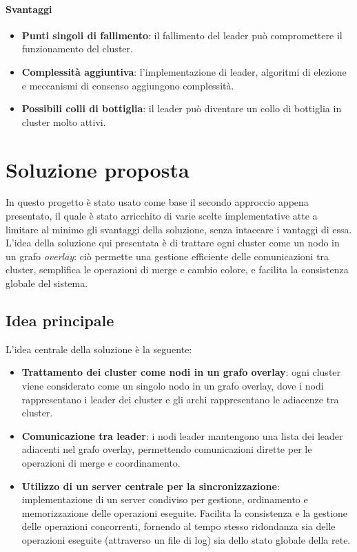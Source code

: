\documentclass[12pt, a4paper]{report}
\begin{document}
\paragraph{Svantaggi}

\begin{itemize}
    \item \textbf{Punti singoli di fallimento}: il fallimento del leader pu\`o compromettere il funzionamento del cluster.
    \item \textbf{Complessit\`a aggiuntiva}: l'implementazione di leader, algoritmi di elezione e meccanismi di consenso aggiungono complessit\`a.
    \item \textbf{Possibili colli di bottiglia}: il leader pu\`o diventare un collo di bottiglia in cluster molto attivi.
\end{itemize}

\section{Soluzione proposta}

In questo progetto \`e stato usato come base il secondo approccio appena presentato, il quale \`e stato arricchito di varie scelte implementative atte a limitare al minimo gli svantaggi della soluzione, senza intaccare i vantaggi di essa. L'idea della soluzione qui presentata \`e di trattare ogni cluster come un nodo in un grafo \emph{overlay}: ci\`o permette una gestione efficiente delle comunicazioni tra cluster, semplifica le operazioni di merge e cambio colore, e facilita la consistenza globale del sistema.

\subsection{Idea principale}

L'idea centrale della soluzione \`e la seguente:

\begin{itemize}
    \item \textbf{Trattamento dei cluster come nodi in un grafo overlay}: ogni cluster viene considerato come un singolo nodo in un grafo overlay, dove i nodi rappresentano i leader dei cluster e gli archi rappresentano le adiacenze tra cluster.
    \item \textbf{Comunicazione tra leader}: i nodi leader mantengono una lista dei leader adiacenti nel grafo overlay, permettendo comunicazioni dirette per le operazioni di merge e coordinamento.
    \item \textbf{Utilizzo di un server centrale per la sincronizzazione}: implementazione di un server condiviso per gestione, ordinamento e memorizzazione delle operazioni eseguite. Facilita la consistenza e la gestione delle operazioni concorrenti, fornendo al tempo stesso ridondanza sia delle operazioni eseguite (attraverso un file di log) sia dello stato globale della rete.
\end{itemize}
\end{document}
